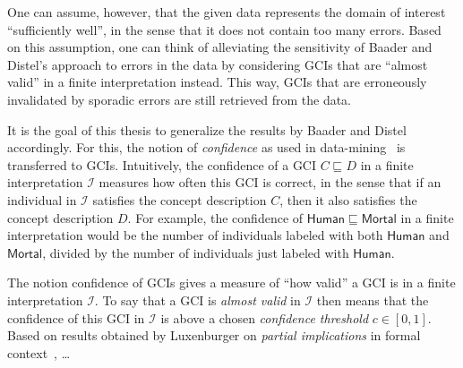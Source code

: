 \documentclass[english,fleqn]{scrartcl}
\begin{document}
One can assume, however, that the given data represents the domain of interest
\enquote{sufficiently well}, in the sense that it does not contain too many errors.  Based
on this assumption, one can think of alleviating the sensitivity of Baader and Distel's
approach to errors in the data by considering GCIs that are \enquote{almost valid} in a
finite interpretation instead.  This way, GCIs that are erroneously invalidated by
sporadic errors are still retrieved from the data.

It is the goal of this thesis to generalize the results by Baader and Distel accordingly.
For this, the notion of \emph{confidence} as used in
data-mining~\cite{arules:agrawal:association-rules} is transferred to GCIs.  Intuitively,
the confidence of a GCI $C \sqsubseteq D$ in a finite interpretation $\mathcal{I}$
measures how often this GCI is correct, in the sense that if an individual in
$\mathcal{I}$ satisfies the concept description $C$, then it also satisfies the concept
description $D$.  For example, the confidence of $\mathsf{Human} \sqsubseteq
\mathsf{Mortal}$ in a finite interpretation would be the number of individuals labeled
with both $\mathsf{Human}$ and $\mathsf{Mortal}$, divided by the number of individuals
just labeled with $\mathsf{Human}$.

The notion confidence of GCIs gives a measure of \enquote{how valid} a GCI is in a finite
interpretation $\mathcal{I}$.  To say that a GCI is \emph{almost valid} in $\mathcal{I}$
then means that the confidence of this GCI in $\mathcal{I}$ is above a chosen
\emph{confidence threshold} $c \in [0,1]$.  Based on results obtained by Luxenburger on
\emph{partial implications} in formal context~\cite{diss:Luxenburger}, \dots

\printbibliography{}
\end{document}
